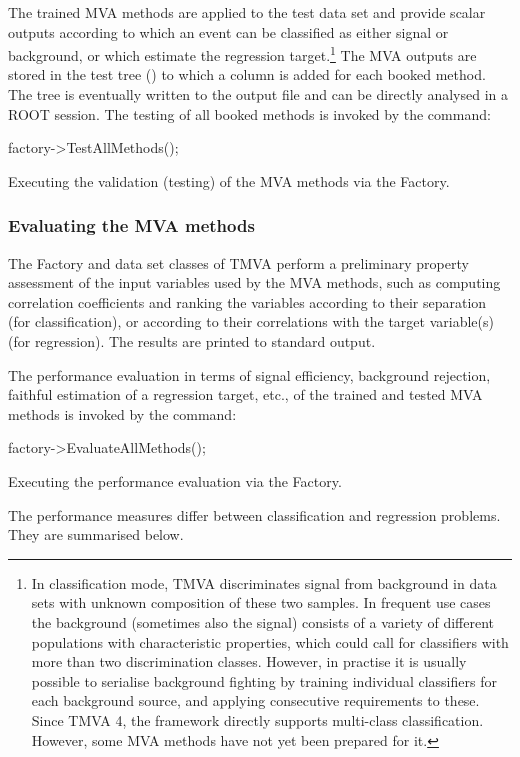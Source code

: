 The trained MVA methods are applied to the test data set and provide
scalar outputs according to which an event can be classified as either
signal or background, or which estimate the regression
target.\footnote { In classification mode, TMVA discriminates signal
  from background in data sets with unknown composition of these two
  samples.  In frequent use cases the background (sometimes also the
  signal) consists of a variety of different populations with
  characteristic properties, which could call for classifiers with
  more than two discrimination classes. However, in practise it is
  usually possible to serialise background fighting by training
  individual classifiers for each background source, and applying
  consecutive requirements to these. Since TMVA 4, the framework directly
  supports multi-class classification. However, some MVA
  methods have not yet been prepared for it.  }  The MVA outputs are
stored in the test tree () to which a column is added
for each booked method. The tree is eventually written to the output
file and can be directly analysed in a ROOT session. The testing of
all booked methods is invoked by the command:
\begin{codeexample}
\begin{tmvacode}
factory->TestAllMethods(); 
\end{tmvacode}
\caption[.]{\codeexampleCaptionSize Executing the validation (testing) of the MVA
            methods via the Factory.}
\end{codeexample}

\subsubsection{Evaluating the
               MVA methods}
\label{sec:usingtmva:evaluation}

The Factory and data set classes of TMVA perform a preliminary
property assessment of the input variables used by the MVA methods,
such as computing correlation coefficients and ranking the variables
according to their separation (for classification), or according to
their correlations with the target variable(s) (for regression). The
results are printed to standard output.

The performance evaluation in terms of signal efficiency, background rejection, 
faithful estimation of a regression target, etc., of the trained and tested MVA 
methods is invoked by the command:
\begin{codeexample}
\begin{tmvacode}
factory->EvaluateAllMethods();
\end{tmvacode}
\caption[.]{\codeexampleCaptionSize Executing the performance evaluation 
            via the Factory.}
\end{codeexample}
The performance measures differ between classification and regression
problems. They are summarised below.


